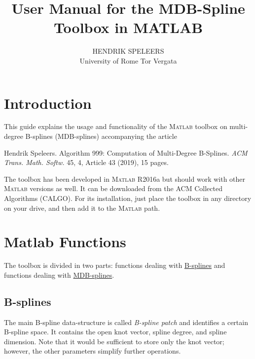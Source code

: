 \documentclass[10pt]{./acmtrans2e}
\title{User Manual for the MDB-Spline Toolbox in {MATLAB}}
\author{HENDRIK SPELEERS\\University of Rome Tor Vergata}
\newcommand{\Matlab}{\textsc{Matlab} }
\begin{document}
\maketitle

\vspace*{-0.7cm}

\section{Introduction}

This guide explains the usage and functionality of the \Matlab toolbox on multi-degree B-splines (MDB-splines) accompanying the article

\begin{center}
\begin{minipage}{0.87\textwidth}
Hendrik Speleers. Algorithm 999: Computation of Multi-Degree B-Splines. \emph{ACM Trans. Math. Softw.} 45, 4, Article 43 (2019), 15 pages.
\end{minipage}
\end{center}

\noindent The toolbox has been developed in \Matlab R2016a but should work with other \Matlab versions as well. 
It can be downloaded from the ACM Collected Algorithms (CALGO). For its installation, just place the toolbox in any directory on your drive, and then add it to the \Matlab path.


\section{Matlab Functions}

The toolbox is divided in two parts: functions dealing with \hyperref[sec:matlab-b]{B-splines} and functions dealing with \hyperref[sec:matlab-mdb]{MDB-splines}. 

\subsection{B-splines}\label{sec:matlab-b}

The main B-spline data-structure is called \emph{B-spline patch} and identifies a certain B-spline space. It contains the open knot vector, spline degree, and spline dimension.
Note that it would be sufficient to store only the knot vector; however, the other parameters simplify further operations.
\end{document}

